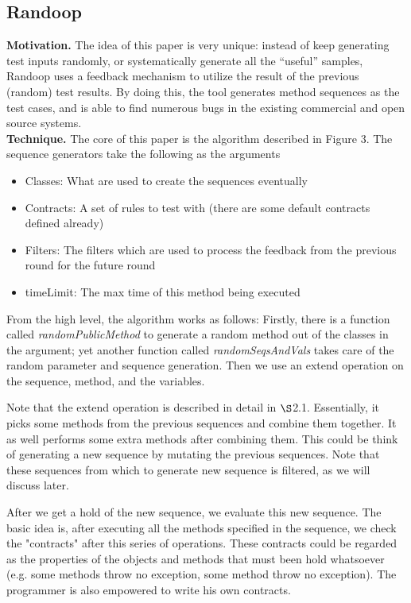 \documentclass[12pt]{article}
\begin{document}
\subsection{Randoop}
\label{sec:review:randoop}

\textbf{Motivation.} The idea of this paper is very unique: instead of keep generating test inputs randomly, or systematically generate all the ``useful'' samples, Randoop uses a feedback mechanism to utilize the result of the previous (random) test results. By doing this, the tool generates method sequences as the test cases, and is able to find numerous bugs in the existing commercial and open source systems.
\\

\noindent
\textbf{Technique.} The core of this paper is the algorithm described in Figure 3. The sequence generators take the following as the arguments
\begin{itemize}
	\item Classes: What are used to create the sequences eventually
	\item Contracts: A set of rules to test with (there are some default contracts defined already)
	\item Filters: The filters which are used to process the feedback from the previous round for the future round
	\item timeLimit: The max time of this method being executed
\end{itemize}

From the high level, the algorithm works as follows: Firstly, there is a function called \textit{randomPublicMethod} to generate a random method out of the classes in the argument; yet another function called \textit{randomSeqsAndVals} takes care of the random parameter and sequence generation. Then we use an extend operation on the sequence, method, and the variables.

Note that the extend operation is described in detail in $\S$2.1. Essentially, it picks some methods from the previous sequences and combine them together. It as well performs some extra methods after combining them. This could be think of generating a new sequence by mutating the previous sequences. Note that these sequences from which to generate new sequence is filtered, as we will discuss later.

After we get a hold of the new sequence, we evaluate this new sequence. The basic idea is, after executing all the methods specified in the sequence, we check the "contracts" after this series of operations. These contracts could be regarded as the properties of the objects and methods that must been hold whatsoever (e.g. some methods throw no exception, some method throw no exception). The programmer is also empowered to write his own contracts.
\end{document}
